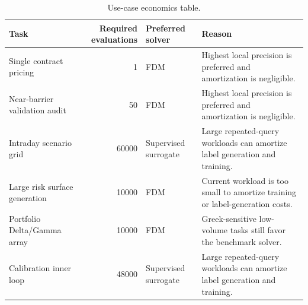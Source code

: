 \begin{table}
\caption{Use-case economics table.}
\label{tab:use_case_economics_ch9}
\begin{tabular}{lrll}
\toprule
Task & Required evaluations & Preferred solver & Reason \\
\midrule
Single contract pricing & 1 & FDM & Highest local precision is preferred and amortization is negligible. \\
Near-barrier validation audit & 50 & FDM & Highest local precision is preferred and amortization is negligible. \\
Intraday scenario grid & 60000 & Supervised surrogate & Large repeated-query workloads can amortize label generation and training. \\
Large risk surface generation & 10000 & FDM & Current workload is too small to amortize training or label-generation costs. \\
Portfolio Delta/Gamma array & 10000 & FDM & Greek-sensitive low-volume tasks still favor the benchmark solver. \\
Calibration inner loop & 48000 & Supervised surrogate & Large repeated-query workloads can amortize label generation and training. \\
\bottomrule
\end{tabular}
\end{table}
